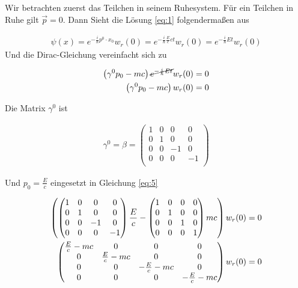 Wir betrachten zuerst das Teilchen in seinem Ruhesystem. Für ein Teilchen in Ruhe gilt \(\vec p=0\). Dann Sieht die Lösung \eqref{eq:1} folgendermaßen aus

\begin{align}
  \label{eq:2}
  \psi(x) =  e^{-\frac{i}{\hbar}p^0\cdot x_0}w_r(0) = e^{-\frac{i}{\hbar}\frac{E}{c}ct  }w_r(0) =e^{-\frac{i}{\hbar}Et  }w_r(0)
\end{align}
Und die Dirac-Gleichung vereinfacht sich zu

\begin{align}
  \label{eq:5}
  \left(\gamma^0p_0 - mc\right) \cancel{e^{-\frac{i}{\hbar}Et  }} w_r(0)  &= 0 \notag\\
 \left(\gamma^0p_0 - mc\right) w_r(0)  &= 0 
\end{align}

Die Matrix \(\gamma^0\) ist

\begin{align}
  \label{eq:6}
  \gamma^0 = \beta =
  \begin{pmatrix}
    1&0&0&0\\
    0&1&0&0\\ 
    0&0&-1&0\\
    0&0&0&-1\\
  \end{pmatrix}
\end{align}

Und \(p_0=\frac{E}{c}\) eingesetzt in Gleichung \eqref{eq:5}

\begin{align}
  \label{eq:7}
   \left( 
  \begin{pmatrix}
    1&0&0&0\\
    0&1&0&0\\ 
    0&0&-1&0\\
    0&0&0&-1
  \end{pmatrix}\frac{E}{c} 
-  \begin{pmatrix}
    1&0&0&0\\
    0&1&0&0\\ 
    0&0&1&0\\
    0&0&0&1
  \end{pmatrix}
  mc\right) w_r(0)  &= 0 \notag \\
 \begin{pmatrix}
    \frac{E}{c} - mc&0&0&0\\
    0&\frac{E}{c} - mc&0&0\\ 
    0&0&-\frac{E}{c} - mc&0\\
    0&0&0&-\frac{E}{c} - mc
  \end{pmatrix} w_r(0) &=0
\end{align}

